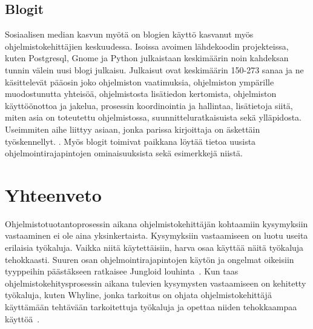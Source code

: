 \documentclass[finnish]{../tktltiki2}
\theoremstyle{definition}
\theoremstyle{remark}
\begin{document}
\subsection{Blogit}
Sosiaalisen median kasvun myötä on blogien käyttö kasvanut myös ohjelmistokehittäjien keskuudessa. Isoissa avoimen lähdekoodin projekteissa, kuten Postgresql, Gnome ja Python julkaistaan keskimäärin noin kahdeksan tunnin välein uusi blogi julkaisu. Julkaisut ovat keskimäärin 150-273 sanaa ja ne käsittelevät pääosin joko ohjelmiston vaatimuksia, ohjelmiston ympärille muodostunutta yhteisöä, ohjelmistosta lisätiedon kertomista, ohjelmiston käyttöönottoa ja jakelua, prosessin koordinointia ja hallintaa, lisätietoja siitä, miten asia on toteutettu ohjelmistossa, suunnitteluratkaisuista sekä ylläpidosta. Useimmiten aihe liittyy asiaan, jonka parissa kirjoittaja on äskettäin työskennellyt. \cite{how-dev-blog}.
Myös blogit toimivat paikkana löytää tietoa uusista ohjelmointirajapintojen ominaisuuksista sekä esimerkkejä niistä.

\section{Yhteenveto}
Ohjelmistotuotantoprosessin aikana ohjelmistokehittäjän kohtaamiin kysymyksiin vastaaminen ei ole aina yksinkertaista.
Kysymyksiin vastaamiseen on luotu useita erilaisia työkaluja. Vaikka niitä käytettäisiin, harva osaa käyttää näitä työkaluja tehokkaasti.
Suuren osan ohjelmointirajapintojen käytön ja ongelmat oikeisiin tyyppeihin päästäkseen ratkaisee Jungloid louhinta~\cite{jungloid-mining}. Kun taas ohjelmistokehitysprosessin aikana tulevien kysymysten vastaamiseen on kehitetty työkaluja, kuten Whyline, jonka tarkoitus on ohjata ohjelmistokehittäjä käyttämään tehtävään tarkoitettuja työkaluja ja opettaa niiden tehokkaampaa käyttöä~\cite{whyline}.

\newpage


\end{document}
